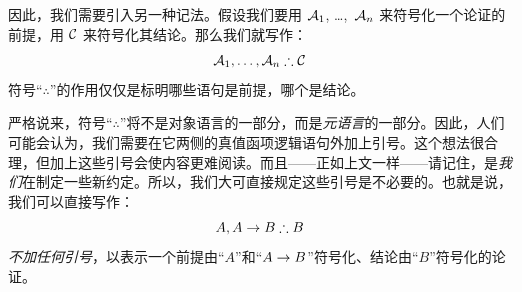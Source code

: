 因此，我们需要引入另一种记法。假设我们要用 $\mathcal{A}_1$, \dots,~$\mathcal{A}_n$ 来符号化一个论证的前提，用 $\mathcal{C}$ 来符号化其结论。那么我们就写作：
$$\metav{A}_1, \ldots, \metav{A}_n \therefore \metav{C}$$
符号“$\therefore$”的作用仅仅是标明哪些语句是前提，哪个是结论。


严格说来，符号“$\therefore$”将不是对象语言的一部分，而是\emph{元语言}的一部分。因此，人们可能会认为，我们需要在它两侧的真值函项逻辑语句外加上引号。这个想法很合理，但加上这些引号会使内容更难阅读。而且——正如上文一样——请记住，是\emph{我们}在制定一些新约定。所以，我们大可直接规定这些引号是不必要的。也就是说，我们可以直接写作：
$$A, A \eif B \therefore B$$
\emph{不加任何引号}，以表示一个前提由“$A$”和“$A \rightarrow B$”符号化、结论由“$B$”符号化的论证。
